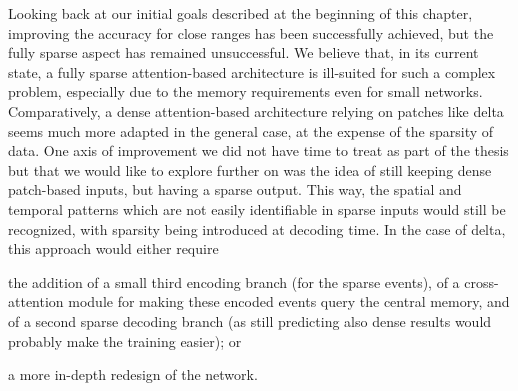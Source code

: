 Looking back at our initial goals described at the beginning of this chapter, improving the accuracy for close ranges has been successfully achieved, but the fully sparse aspect has remained unsuccessful. We believe that, in its current state, a fully sparse attention-based architecture is ill-suited for such a complex problem, especially due to the memory requirements even for small networks. Comparatively, a dense attention-based architecture relying on patches like \acrshort{delta} seems much more adapted in the general case, at the expense of the sparsity of data. One axis of improvement we did not have time to treat as part of the thesis but that we would like to explore further on was the idea of still keeping dense patch-based inputs, but having a sparse output. This way, the spatial and temporal patterns which are not easily identifiable in sparse inputs would still be recognized, with sparsity being introduced at decoding time. In the case of \acrshort{delta}, this approach would either require
\begin{enumerate*}[label=\textbf{(\arabic*)}]
  \item the addition of a small third encoding branch (for the sparse events), of a cross-attention module for making these encoded events query the central memory, and of a second sparse decoding branch (as still predicting also dense results would probably make the training easier); or
  \item a more in-depth redesign of the network.
\end{enumerate*}
